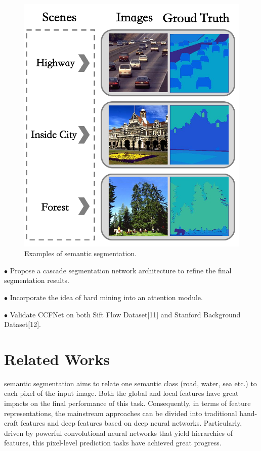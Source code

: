 \documentclass[10.5pt,compsoc]{TsT}
\theoremstyle{mystyle}
\begin{document}
{\begin{figure}
\centering
\includegraphics[width=0.95\columnwidth]{fig1.png}
\caption{Examples of semantic segmentation.}
\label{fig:example}
\end{figure} 


\noindent
  $\bullet$ Propose a cascade segmentation network architecture to refine the final segmentation results.
  
\noindent
  $\bullet$ Incorporate the idea of hard mining into an attention module.
  
\noindent
  $\bullet$ Validate CCFNet on both Sift Flow Dataset[11] and Stanford Background Dataset[12].


\section{Related Works}
\label{s:Related}
\noindent
semantic segmentation aims to relate one semantic class (road, water, sea etc.) to each pixel of the input image. Both the global and local features have great impacts on the final performance of this task. Consequently, in terms of feature representations, the mainstream approaches can be divided into traditional hand-craft features and deep features based on deep neural networks. Particularly, driven by powerful convolutional neural networks that yield hierarchies of features, this pixel-level prediction tasks have achieved great progress.

}
\end{document}
